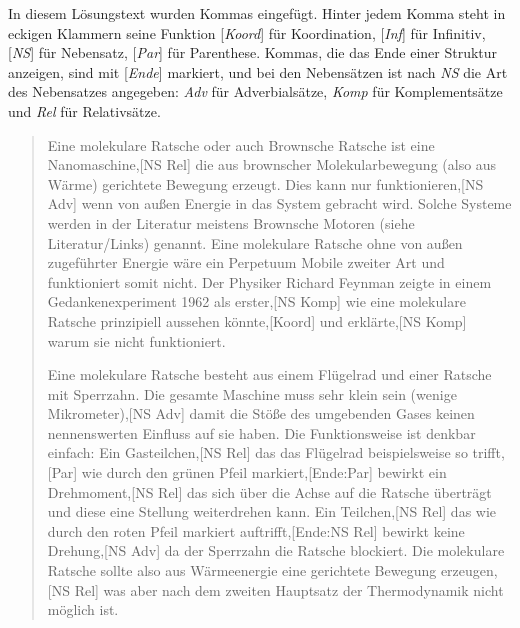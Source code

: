  In diesem Lösungstext wurden Kommas eingefügt.
Hinter jedem Komma steht in eckigen Klammern seine Funktion [\textit{Koord}] für Koordination, [\textit{Inf}] für Infinitiv, [\textit{NS}] für Nebensatz, [\textit{Par}] für Parenthese.
Kommas, die das Ende einer Struktur anzeigen, sind mit [\textit{Ende}] markiert, und bei den Nebensätzen ist nach \textit{NS} die Art des Nebensatzes angegeben: \textit{Adv} für Adverbialsätze, \textit{Komp} für Komplementsätze und \textit{Rel} für Relativsätze.

\vspace{0.5cm}

\begin{sloppypar}
\begin{quote}
Eine molekulare Ratsche oder auch Brownsche Ratsche ist eine Nanomaschine,[NS Rel] die aus brownscher Molekularbewegung (also aus Wärme) gerichtete Bewegung erzeugt.
Dies kann nur funktionieren,[NS Adv] wenn von außen Energie in das System gebracht wird.
Solche Systeme werden in der Literatur meistens Brownsche Motoren (siehe Literatur/Links) genannt.
Eine molekulare Ratsche ohne von außen zugeführter Energie wäre ein Perpetuum Mobile zweiter Art und funktioniert somit nicht.
Der Physiker Richard Feynman zeigte in einem Gedankenexperiment 1962 als erster,[NS Komp] wie eine molekulare Ratsche prinzipiell aussehen könnte,[Koord] und erklärte,[NS Komp] warum sie nicht funktioniert.

Eine molekulare Ratsche besteht aus einem Flügelrad und einer Ratsche mit Sperrzahn.
Die gesamte Maschine muss sehr klein sein (wenige Mikrometer),[NS Adv] damit die Stöße des umgebenden Gases keinen nennenswerten Einfluss auf sie haben.
Die Funktionsweise ist denkbar einfach:
Ein Gasteilchen,[NS Rel] das das Flügelrad beispielsweise so trifft,[Par] wie durch den grünen Pfeil markiert,[Ende:Par] bewirkt ein Drehmoment,[NS Rel] das sich über die Achse auf die Ratsche überträgt und diese eine Stellung weiterdrehen kann.
Ein Teilchen,[NS Rel] das wie durch den roten Pfeil markiert auftrifft,[Ende:NS Rel] bewirkt keine Drehung,[NS Adv] da der Sperrzahn die Ratsche blockiert.
Die molekulare Ratsche sollte also aus Wärmeenergie eine gerichtete Bewegung erzeugen,[NS Rel] was aber nach dem zweiten Hauptsatz der Thermodynamik nicht möglich ist.


\end{quote}
\end{sloppypar}
